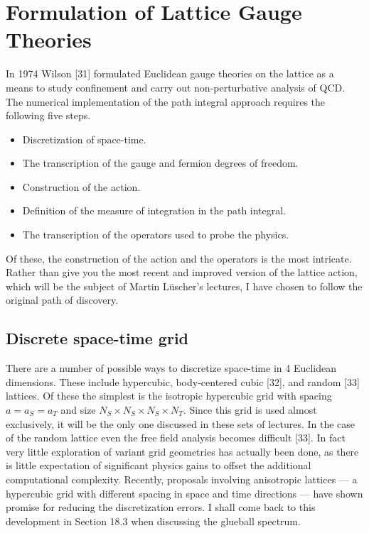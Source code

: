 \chapter{Formulation of Lattice Gauge Theories}

In 1974 Wilson [31] formulated Euclidean gauge theories on the lattice as a means to study confinement and carry out non-perturbative analysis of QCD. The numerical implementation of the path integral approach requires the following five steps.
\begin{itemize}
  \item Discretization of space-time.
  \item The transcription of the gauge and fermion degrees of freedom.
  \item Construction of the action.
  \item Definition of the measure of integration in the path integral.
  \item The transcription of the operators used to probe the physics.
\end{itemize}
Of these, the construction of the action and the operators is the most intricate. Rather than give you the most recent and improved version of the lattice action, which will be the subject of Martin L\"uscher's lectures, I have chosen to follow the original path of discovery.

\section{Discrete space-time grid}

There are a number of possible ways to discretize space-time in 4 Euclidean dimensions. These include hypercubic, body-centered cubic [32], and random [33] lattices. Of these the simplest is the isotropic hypercubic grid with spacing \(a = a_S = a_T\) and size \(N_S \times N_S \times N_S \times N_T\). Since this grid is used almost exclusively, it will be the only one discussed in these sets of lectures. In the case of the random lattice even the free field analysis becomes difficult [33]. In fact very little exploration of variant grid geometries has actually been done, as there is little expectation of significant physics gains to offset the additional computational complexity. Recently, proposals involving anisotropic lattices --- a hypercubic grid with different spacing in space and time directions --- have shown promise for reducing the discretization errors. I shall come back to this development in Section 18.3 when discussing the glueball spectrum.

